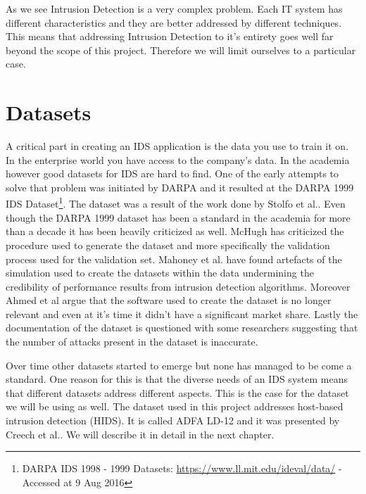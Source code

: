 \documentclass[reqno,openany,12pt]{amsbook}
\begin{document}
As we see Intrusion Detection is a very complex problem.  Each IT system has different characteristics and they are better addressed by different techniques. This means that addressing Intrusion Detection to it's entirety goes well far beyond the scope of this project. Therefore we will limit ourselves to a particular case.




\section{Datasets}

A critical part in creating an IDS application is the data you use to train it on. In the enterprise world you have access to the company's data. In the academia however good datasets for IDS are hard to find. One of the early attempts to solve that problem was initiated by DARPA and it resulted at the DARPA 1999 IDS Dataset\footnote{DARPA IDS 1998 - 1999 Datasets: \url{https://www.ll.mit.edu/ideval/data/} - Accessed at 9 Aug 2016}. The dataset was a result of the work done by Stolfo et al.\cite{dat01}. Even though the DARPA 1999 dataset has been a standard in the academia for more than a decade it has been heavily criticized as well. McHugh\cite{dat02} has criticized the procedure used to generate the dataset and more specifically the validation process  used for the validation set. Mahoney et al.\cite{dat03} have found artefacts of the simulation used to create the datasets within the data undermining the credibility of performance results from intrusion detection algorithms. Moreover Ahmed et al\cite{dat04} argue that the software used to create the dataset is no longer relevant and even at it's time it didn't have a significant market share. Lastly the documentation of the dataset is questioned with some researchers suggesting
that the number of attacks present in the dataset is inaccurate.

Over time other datasets started to emerge but none has managed to be come a standard. One reason for this is that the diverse needs of an IDS system means that different datasets address different aspects. This is the case for the dataset we will be using as well. The dataset used in this project addresses host-based intrusion detection (HIDS). It is called ADFA LD-12 and it was presented by Creech et al.\cite{dat2}. We will describe it in detail in the next chapter.
\end{document}
